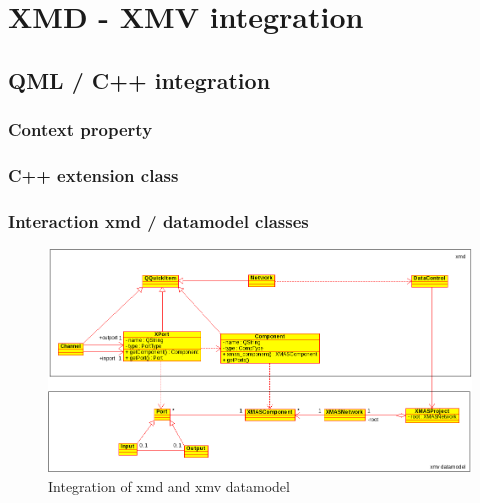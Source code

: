 \section{XMD - XMV integration}

\subsection{QML / C++ integration}

\subsubsection{Context property}



\subsubsection{C++ extension class}



\subsubsection{Interaction xmd / datamodel classes}

\begin{figure}
    \includegraphics[width=\textwidth]{xmd-xmv-integration}
    \caption{Integration of xmd and xmv datamodel}
\end{figure}
